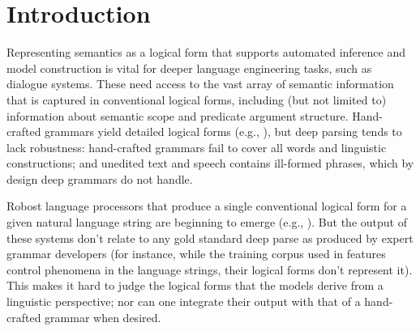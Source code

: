 \section{Introduction} \label{sec:intro}



Representing semantics as a logical form that supports automated
inference and model construction is vital for deeper language
engineering tasks, such as dialogue systems.
These need access to the vast array of
semantic information that is captured in conventional logical forms,
including (but not limited to) information about semantic scope and
predicate argument structure.  Hand-crafted grammars yield detailed
logical forms (e.g., \cite{butt:etal:1999,copestake:flickinger:2000}), but deep parsing tends to lack
robustness: hand-crafted grammars fail to cover all words and
linguistic constructions; and unedited text and speech contains
ill-formed phrases, which by design deep grammars do not handle.  

Robost language processors that produce a single conventional logical
form for a given natural language string are beginning to emerge
(e.g.,
\cite{bos:etal:2004,rupp:etal:2000,wong:mooney:2006,zettlemoyer:collins:2005}).
But the output of these systems don't relate to any gold standard deep
parse as produced by expert grammar developers (for instance, while
the training corpus used in \cite{zettlemoyer:collins:2005} features
control phenomena in the language strings, their logical forms don't
represent it).  This makes it hard to judge the logical forms that the
models derive from a linguistic perspective; nor can one integrate
their output with that of a hand-crafted grammar when desired.

